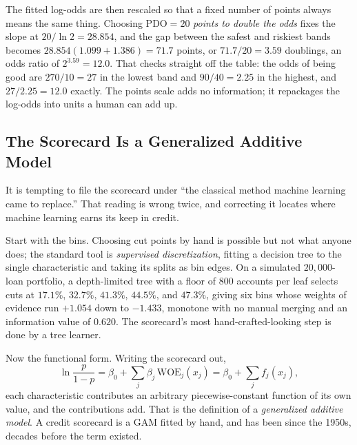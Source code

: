 \documentclass[../ai_in_finance]{subfiles}
\begin{document}
The fitted log-odds are then rescaled so that a fixed number of points always means the same thing. Choosing $\text{PDO}=20$ \emph{points to double the odds} fixes the slope at $20/\ln 2 = 28.854$, and the gap between the safest and riskiest bands becomes $28.854(1.099+1.386) = 71.7$ points, or $71.7/20 = 3.59$ doublings, an odds ratio of $2^{3.59}=12.0$. That checks straight off the table: the odds of being good are $270/10 = 27$ in the lowest band and $90/40 = 2.25$ in the highest, and $27/2.25 = 12.0$ exactly. The points scale adds no information; it repackages the log-odds into units a human can add up.

\subsection{The Scorecard Is a Generalized Additive Model}
\label{sec:gam-connection}

It is tempting to file the scorecard under ``the classical method machine learning came to replace.'' That reading is wrong twice, and correcting it locates where machine learning earns its keep in credit.

Start with the bins. Choosing cut points by hand is possible but not what anyone does; the standard tool is \emph{supervised discretization}, fitting a decision tree to the single characteristic and taking its splits as bin edges. On a simulated $20{,}000$-loan portfolio, a depth-limited tree with a floor of $800$ accounts per leaf selects cuts at $17.1\%$, $32.7\%$, $41.3\%$, $44.5\%$, and $47.3\%$, giving six bins whose weights of evidence run $+1.054$ down to $-1.433$, monotone with no manual merging and an information value of $0.620$. The scorecard's most hand-crafted-looking step is done by a tree learner.

Now the functional form. Writing the scorecard out,
\begin{equation}
\label{eq:creditrisk-scorecard-gam}
\ln\frac{p}{1-p} = \beta_0 + \sum_j \beta_j\,\text{WOE}_j(x_j) = \beta_0 + \sum_j f_j(x_j),
\end{equation}
each characteristic contributes an arbitrary piecewise-constant function of its own value, and the contributions add. That is the definition of a \emph{generalized additive model}. A credit scorecard is a GAM fitted by hand, and has been since the 1950s, decades before the term existed.
\end{document}
